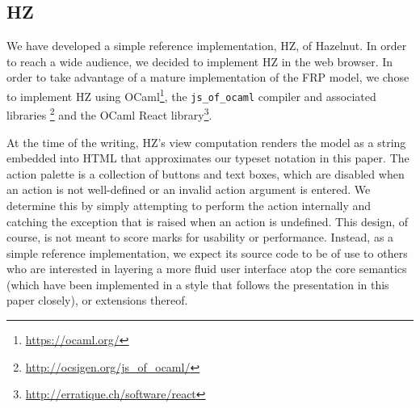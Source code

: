 \subsection{HZ}
We have developed a simple reference implementation, HZ, of Hazelnut.  In
order to reach a wide audience, we decided to implement HZ in the web
browser.  In order to take advantage of a mature implementation of the FRP
model, we chose to implement HZ using
OCaml\footnote{\url{https://ocaml.org/}}, the \texttt{js\_of\_ocaml}
compiler and associated libraries
\cite{DBLP:conf/ml/Balat06}\footnote{\url{http://ocsigen.org/js\_of\_ocaml/}}
and the OCaml React
library\footnote{\url{http://erratique.ch/software/react}}.

At the time of the writing, HZ's view computation renders the model as a
string embedded into HTML that approximates our typeset notation in this
paper. The action palette is a collection of buttons and text boxes, which
are disabled when an action is not well-defined or an invalid action
argument is entered. We determine this by simply attempting to perform the
action internally and catching the exception that is raised when an action
is undefined. This design, of course, is not meant to score marks for
usability or performance. Instead, as a simple reference implementation, we
expect its source code to be of use to others who are interested in
layering a more fluid user interface atop the core semantics (which have
been implemented in a style that follows the presentation in this paper
closely), or extensions thereof.
